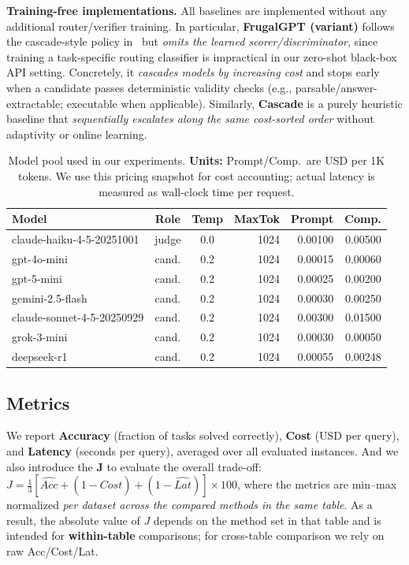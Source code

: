\documentclass[acmsmall,screen,review,anonymous]{acmart}
\begin{document}
\textbf{Training-free implementations.}
All baselines are implemented without any additional router/verifier training.
In particular, \textbf{FrugalGPT (variant)} follows the cascade-style policy in~\cite{chen2023frugalgpt} but \emph{omits the learned scorer/discriminator}, since training a task-specific routing classifier is impractical in our zero-shot black-box API setting.
Concretely, it \emph{cascades models by increasing cost} and stops early when a candidate passes deterministic validity checks (e.g., parsable/answer-extractable; executable when applicable).
Similarly, \textbf{Cascade} is a purely heuristic baseline that \emph{sequentially escalates along the same cost-sorted order} without adaptivity or online learning.
\begin{table}[H]
\centering
\caption{Model pool used in our experiments. \textbf{Units:} Prompt/Comp.\ are USD per 1K tokens. We use this pricing snapshot for cost accounting; actual latency is measured as wall-clock time per request.}
\label{tab:model_pool}
\small
\setlength{\tabcolsep}{6pt}
\begin{tabular}{l c c r r r}
\toprule
\textbf{Model} & \textbf{Role} & \textbf{Temp} & \textbf{MaxTok} & \textbf{Prompt} & \textbf{Comp.} \\
\midrule
claude-haiku-4-5-20251001      & judge & 0.0 & 1024 & 0.00100 & 0.00500 \\
\midrule
gpt-4o-mini                    & cand. & 0.2 & 1024 & 0.00015 & 0.00060 \\
gpt-5-mini                     & cand. & 0.2 & 1024 & 0.00025 & 0.00200 \\
gemini-2.5-flash               & cand. & 0.2 & 1024 & 0.00030 & 0.00250 \\
claude-sonnet-4-5-20250929     & cand. & 0.2 & 1024 & 0.00300 & 0.01500 \\
grok-3-mini                    & cand. & 0.2 & 1024 & 0.00030 & 0.00050 \\
deepseek-r1                    & cand. & 0.2 & 1024 & 0.00055 & 0.00248 \\
\bottomrule
\end{tabular}
\end{table}


\subsection{Metrics}
\label{sec:exp_metrics}
We report \textbf{Accuracy} (fraction of tasks solved correctly), \textbf{Cost} (USD per query), and \textbf{Latency} (seconds per query), averaged over all evaluated instances.
And we also introduce the \textbf{J} to evaluate the overall trade-off: $J = \frac{1}{3} [ \hat{Acc} + (1-\hat{Cost}) + (1-\hat{Lat}) ] \times 100$, where the metrics are min--max normalized \emph{per dataset across the compared methods in the same table}.
As a result, the absolute value of $J$ depends on the method set in that table and is intended for \textbf{within-table} comparisons; for cross-table comparison we rely on raw Acc/Cost/Lat.
\end{document}

